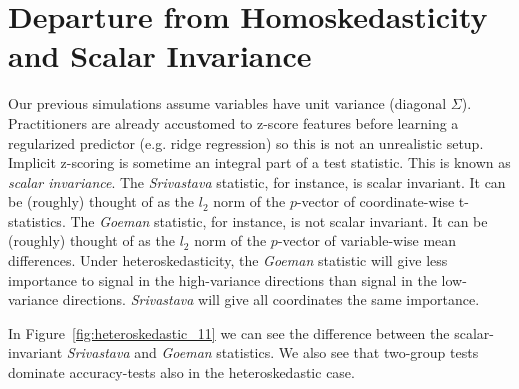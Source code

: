 \documentclass[]{bio}
\begin{document}
\section{Departure from Homoskedasticity and Scalar Invariance}

Our previous simulations assume variables have unit variance (diagonal $\Sigma$). 
Practitioners are already accustomed to z-score features before learning a regularized predictor (e.g. ridge regression) so this is not an unrealistic setup.
Implicit z-scoring is sometime an integral part of a test statistic. 
This is known as \emph{scalar invariance}.
The \emph{Srivastava} statistic, for instance, is scalar invariant. 
It can be (roughly) thought of as the $l_2$ norm of the $p$-vector of coordinate-wise t-statistics.
The \emph{Goeman} statistic, for instance, is not scalar invariant. 
It can be (roughly) thought of as the $l_2$ norm of the $p$-vector of variable-wise mean differences.
Under heteroskedasticity, the \emph{Goeman} statistic will give less importance to signal in the high-variance directions than signal in the low-variance directions. 
\emph{Srivastava} will give all coordinates the same importance.

In Figure~\ref{fig:heteroskedastic_11} we can see the difference between the scalar-invariant \emph{Srivastava} and \emph{Goeman} statistics. 
We also see that two-group tests dominate accuracy-tests also in the heteroskedastic case. 
\end{document}
